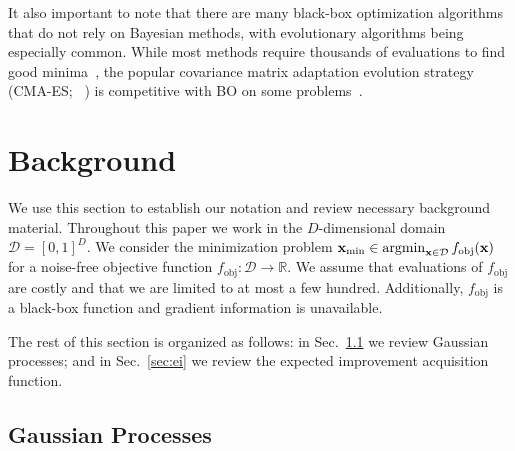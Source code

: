 \documentclass[accepted]{uai2021} %
\newcommand{\fobj}{f_{\text{obj}}}
\newcommand{\bx}{\mathbf{x}}
\newcommand{\DD}{\mathcal{D}}
\begin{document}
It also important to note that there are many black-box optimization algorithms that
do not rely on Bayesian methods, with evolutionary algorithms being especially common.
While most methods require thousands of evaluations to find good minima~\citep{yu2010introduction},
the popular covariance matrix adaptation evolution strategy (CMA-ES; ~\citep{hansen2003reducing}) is competitive with BO on some problems~\citep{letham2020re}.

\section{Background}
\label{sec:bg}

We use this section to establish our notation and review necessary background material.
Throughout this paper we work in the $D$-dimensional domain $\DD = [0, 1]^D$.
We consider the minimization problem $\bx_{\rm min} \in {\rm argmin}_{\bx \in \DD} \,\fobj(\bx)$ for a noise-free
objective function $\fobj: \DD \to \mathbb{R}$.
We assume that evaluations of $\fobj$ are costly and that we are limited to at most a few hundred.
Additionally, $\fobj$ is a black-box function and gradient information is unavailable.

The rest of this section is organized as follows:
in Sec.~\ref{sec:gp} we review Gaussian processes; and in Sec.~\ref{sec:ei} we review the expected improvement
acquisition function.

\subsection{Gaussian Processes}
\label{sec:gp}
\end{document}
